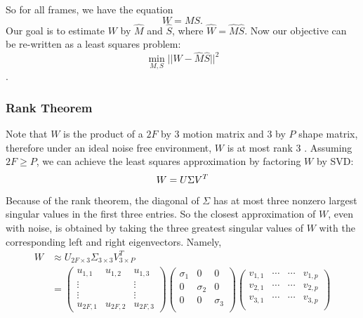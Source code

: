 So for all frames, we have the equation $$W = MS.$$
Our goal is to estimate $W$ by $\hat M$ and $\hat S$, where $\hat W = \hat M
\hat S$.
Now our objective can be re-written as a least squares problem:
\begin{equation}
  \label{eq:fact3}
\min_{M, S}||W - \hat M \hat S||^2
\end{equation}
\cite{Morita}.
\subsubsection{Rank Theorem}
Note that $W$ is the product of a $2F$ by $3$ motion matrix and
$3$ by $P$ shape matrix, therefore under an ideal noise free environment,
$W$ is at most rank 3 \cite{Tomasi}. Assuming $2F \ge P$, we can
achieve the least squares approximation by factoring $W$ by SVD: $$W = U\Sigma V^T\\$$
Because of the rank theorem, the diagonal of $\Sigma$ has at most three nonzero
largest singular values in the first three entries. So the closest approximation of $W$, even with noise,
is obtained by taking the three greatest singular values of $W$ with
the corresponding left and right eigenvectors. Namely,
\begin{align*}
W&\approx U_{2F\times 3}\Sigma_{3 \times 3} V_{3\times P}^T\\
&= \begin{pmatrix}
  u_{1,1} & u_{1,2} & u_{1,3} \\ \vdots & & \vdots
\\ \vdots & & \vdots
\\   u_{2F,1} & u_{2F,2} & u_{2F,3} 
\end{pmatrix}
\begin{pmatrix}
  \sigma_1 & 0 & 0 \\
  0 & \sigma_2 & 0 \\
  0 & 0 & \sigma_3 \\
\end{pmatrix}
\begin{pmatrix}
  v_{1,1} &  \cdots &\cdots & v_{1,p}\\
  v_{2,1} &  \cdots &\cdots & v_{2,p}\\
  v_{3,1} &  \cdots &\cdots & v_{3,p}\\
\end{pmatrix}
\end{align*}

